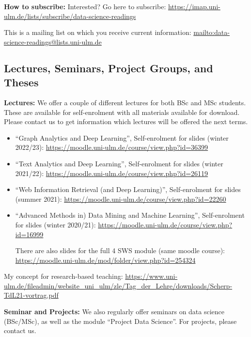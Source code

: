 \documentclass[manuscript, nonacm]{acmart}
\begin{document}
\textbf{How to subscribe:}
Interested? 
Go here to subscribe:
\url{https://imap.uni-ulm.de/lists/subscribe/data-science-readings}

This is a mailing list on which you receive current information: 
\url{mailto:data-science-readings@lists.uni-ulm.de}



\subsection{Lectures, Seminars, Project Groups, and Theses}

\textbf{Lectures:}
We offer a couple of different lectures for both BSc and MSc students.
These are available for self-enrolment with all materials available for download.
Please contact us to get information which lectures will be offered the next terms.

\begin{itemize}
\item ``Graph Analytics and Deep Learning'',
Self-enrolment for slides (winter 2022/23): 
\url{https://moodle.uni-ulm.de/course/view.php?id=36399}

\item ``Text Analytics and Deep Learning'',
Self-enrolment for slides (winter 2021/22): 
\url{https://moodle.uni-ulm.de/course/view.php?id=26119}

\item ``Web Information Retrieval (and Deep Learning)'', 
Self-enrolment for slides (summer 2021): 
\url{https://moodle.uni-ulm.de/course/view.php?id=22260}

\item ``Advanced Methods in) Data Mining and Machine Learning'', 
Self-enrolment for slides (winter 2020/21): 
\url{https://moodle.uni-ulm.de/course/view.php?id=16999}

There are also slides for the full 4 SWS module (same moodle course): 
\url{https://moodle.uni-ulm.de/mod/folder/view.php?id=254324}

\end{itemize}

My concept for research-based teaching:
\url{https://www.uni-ulm.de/fileadmin/website_uni_ulm/zle/Tag_der_Lehre/downloads/Scherp-TdL21-vortrag.pdf}

\textbf{Seminar and Projects:}
We also regularly offer seminars on data science (BSc/MSc), as well as the module ``Project Data Science''.
For projects, please contact us.
\end{document}
